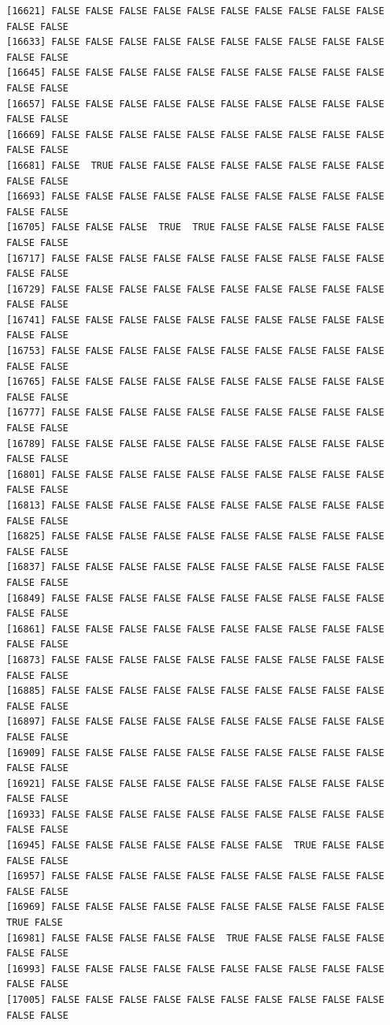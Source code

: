 \documentclass[
  a4paper,
  DIV=11,
  numbers=noendperiod]{scrartcl}
\begin{document}
\begin{verbatim}
[16621] FALSE FALSE FALSE FALSE FALSE FALSE FALSE FALSE FALSE FALSE FALSE FALSE
[16633] FALSE FALSE FALSE FALSE FALSE FALSE FALSE FALSE FALSE FALSE FALSE FALSE
[16645] FALSE FALSE FALSE FALSE FALSE FALSE FALSE FALSE FALSE FALSE FALSE FALSE
[16657] FALSE FALSE FALSE FALSE FALSE FALSE FALSE FALSE FALSE FALSE FALSE FALSE
[16669] FALSE FALSE FALSE FALSE FALSE FALSE FALSE FALSE FALSE FALSE FALSE FALSE
[16681] FALSE  TRUE FALSE FALSE FALSE FALSE FALSE FALSE FALSE FALSE FALSE FALSE
[16693] FALSE FALSE FALSE FALSE FALSE FALSE FALSE FALSE FALSE FALSE FALSE FALSE
[16705] FALSE FALSE FALSE  TRUE  TRUE FALSE FALSE FALSE FALSE FALSE FALSE FALSE
[16717] FALSE FALSE FALSE FALSE FALSE FALSE FALSE FALSE FALSE FALSE FALSE FALSE
[16729] FALSE FALSE FALSE FALSE FALSE FALSE FALSE FALSE FALSE FALSE FALSE FALSE
[16741] FALSE FALSE FALSE FALSE FALSE FALSE FALSE FALSE FALSE FALSE FALSE FALSE
[16753] FALSE FALSE FALSE FALSE FALSE FALSE FALSE FALSE FALSE FALSE FALSE FALSE
[16765] FALSE FALSE FALSE FALSE FALSE FALSE FALSE FALSE FALSE FALSE FALSE FALSE
[16777] FALSE FALSE FALSE FALSE FALSE FALSE FALSE FALSE FALSE FALSE FALSE FALSE
[16789] FALSE FALSE FALSE FALSE FALSE FALSE FALSE FALSE FALSE FALSE FALSE FALSE
[16801] FALSE FALSE FALSE FALSE FALSE FALSE FALSE FALSE FALSE FALSE FALSE FALSE
[16813] FALSE FALSE FALSE FALSE FALSE FALSE FALSE FALSE FALSE FALSE FALSE FALSE
[16825] FALSE FALSE FALSE FALSE FALSE FALSE FALSE FALSE FALSE FALSE FALSE FALSE
[16837] FALSE FALSE FALSE FALSE FALSE FALSE FALSE FALSE FALSE FALSE FALSE FALSE
[16849] FALSE FALSE FALSE FALSE FALSE FALSE FALSE FALSE FALSE FALSE FALSE FALSE
[16861] FALSE FALSE FALSE FALSE FALSE FALSE FALSE FALSE FALSE FALSE FALSE FALSE
[16873] FALSE FALSE FALSE FALSE FALSE FALSE FALSE FALSE FALSE FALSE FALSE FALSE
[16885] FALSE FALSE FALSE FALSE FALSE FALSE FALSE FALSE FALSE FALSE FALSE FALSE
[16897] FALSE FALSE FALSE FALSE FALSE FALSE FALSE FALSE FALSE FALSE FALSE FALSE
[16909] FALSE FALSE FALSE FALSE FALSE FALSE FALSE FALSE FALSE FALSE FALSE FALSE
[16921] FALSE FALSE FALSE FALSE FALSE FALSE FALSE FALSE FALSE FALSE FALSE FALSE
[16933] FALSE FALSE FALSE FALSE FALSE FALSE FALSE FALSE FALSE FALSE FALSE FALSE
[16945] FALSE FALSE FALSE FALSE FALSE FALSE FALSE  TRUE FALSE FALSE FALSE FALSE
[16957] FALSE FALSE FALSE FALSE FALSE FALSE FALSE FALSE FALSE FALSE FALSE FALSE
[16969] FALSE FALSE FALSE FALSE FALSE FALSE FALSE FALSE FALSE FALSE  TRUE FALSE
[16981] FALSE FALSE FALSE FALSE FALSE  TRUE FALSE FALSE FALSE FALSE FALSE FALSE
[16993] FALSE FALSE FALSE FALSE FALSE FALSE FALSE FALSE FALSE FALSE FALSE FALSE
[17005] FALSE FALSE FALSE FALSE FALSE FALSE FALSE FALSE FALSE FALSE FALSE FALSE

\end{verbatim}
\end{document}
